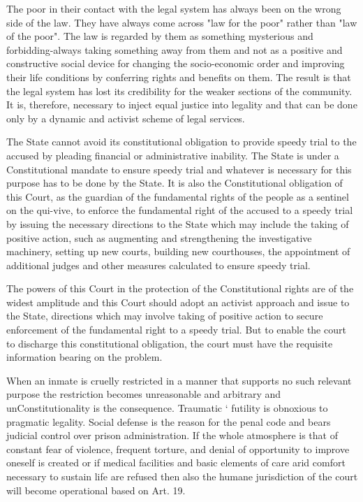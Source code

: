 \begin{multicols}{2}
\noi
The poor in their contact with the legal system has always been on the wrong side of the law. They have always come across "law for the poor" rather than "law of the poor". The law is regarded by them as something mysterious and forbidding-always taking something away from them and not as a positive and constructive social device for changing the socio-economic order and improving their life conditions by conferring rights and benefits on them. The result is that the legal system has lost its credibility for the weaker sections of the community. It is, therefore, necessary to inject equal justice into legality and that can be done only by a dynamic and activist scheme of legal services.

\noi
The State cannot avoid its constitutional obligation to provide speedy trial to the accused by pleading financial or administrative inability. The State is under a Constitutional mandate to ensure speedy trial and whatever is necessary for this purpose has to be done by the State. It is also the Constitutional obligation of this Court, as the guardian of the fundamental rights of the people as a sentinel on the qui-vive, to enforce the fundamental right of the accused to a speedy trial by issuing the necessary directions to the State which may include the taking of positive action, such as augmenting and strengthening the investigative machinery, setting up new courts, building new courthouses, the appointment of additional judges and other measures calculated to ensure speedy trial.

\noi
The powers of this Court in the protection of the Constitutional rights are of the widest amplitude and this Court should adopt an activist approach and issue to the State, directions which may involve taking of positive action to secure enforcement of the fundamental right to a speedy trial. But to enable the court to discharge this constitutional obligation, the court must have the requisite information bearing on the problem.

\noi
When an inmate is cruelly restricted in a manner that supports no such relevant purpose the restriction becomes unreasonable and arbitrary and unConstitutionality is the consequence. Traumatic ` futility is obnoxious to pragmatic legality. Social defense is the reason for the penal code and bears judicial control over prison administration. If the whole atmosphere is that of constant fear of violence, frequent torture, and denial of opportunity to improve oneself is created or if medical facilities and basic elements of care arid comfort necessary to sustain life are refused then also the humane jurisdiction of the court will become operational based on Art. 19.


\end{multicols}
